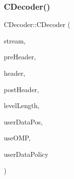 \subsubsection{\texorpdfstring{CDecoder()}{CDecoder()}}
{\footnotesize\ttfamily C\+Decoder\+::\+C\+Decoder (\begin{DoxyParamCaption}\item[{\mbox{\hyperlink{classCPGFStream}{C\+P\+G\+F\+Stream}} $\ast$}]{stream,  }\item[{\mbox{\hyperlink{structPGFPreHeader}{P\+G\+F\+Pre\+Header}} \&}]{pre\+Header,  }\item[{\mbox{\hyperlink{structPGFHeader}{P\+G\+F\+Header}} \&}]{header,  }\item[{\mbox{\hyperlink{structPGFPostHeader}{P\+G\+F\+Post\+Header}} \&}]{post\+Header,  }\item[{U\+I\+N\+T32 $\ast$\&}]{level\+Length,  }\item[{U\+I\+N\+T64 \&}]{user\+Data\+Pos,  }\item[{bool}]{use\+O\+MP,  }\item[{U\+I\+N\+T32}]{user\+Data\+Policy }\end{DoxyParamCaption})}

